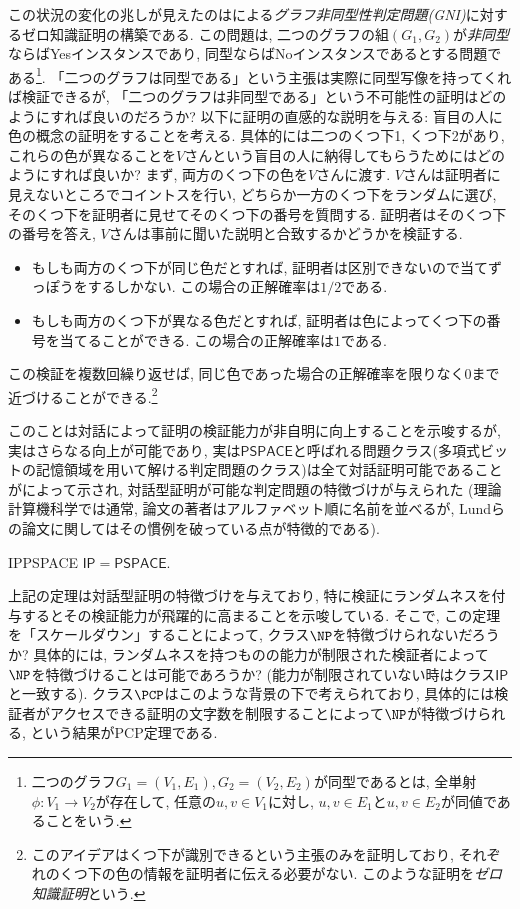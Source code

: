 この状況の変化の兆しが見えたのは\citet{GMW86}による\emph{グラフ非同型性判定問題(GNI)}に対するゼロ知識証明の構築である.
この問題は, 二つのグラフの組$(G_1,G_2)$が\emph{非同型}ならばYesインスタンスであり, 同型ならばNoインスタンスであるとする問題である\footnote{二つのグラフ$G_1=(V_1,E_1),G_2=(V_2,E_2)$が同型であるとは, 全単射$\phi\colon V_1\to V_2$が存在して, 任意の$u,v\in V_1$に対し, $u,v\in E_1$と$u,v\in E_2$が同値であることをいう.}.
「二つのグラフは同型である」という主張は実際に同型写像を持ってくれば検証できるが, 「二つのグラフは非同型である」という不可能性の証明はどのようにすれば良いのだろうか?
以下に証明の直感的な説明を与える:
盲目の人に色の概念の証明をすることを考える.
具体的には二つのくつ下1, くつ下2があり, これらの色が異なることを$V$さんという盲目の人に納得してもらうためにはどのようにすれば良いか?
まず, 両方のくつ下の色を$V$さんに渡す.
$V$さんは証明者に見えないところでコイントスを行い, どちらか一方のくつ下をランダムに選び, そのくつ下を証明者に見せてそのくつ下の番号を質問する.
証明者はそのくつ下の番号を答え, $V$さんは事前に聞いた説明と合致するかどうかを検証する.
\begin{itemize}
  \item もしも両方のくつ下が同じ色だとすれば, 証明者は区別できないので当てずっぽうをするしかない. この場合の正解確率は$1/2$である.
  \item もしも両方のくつ下が異なる色だとすれば, 証明者は色によってくつ下の番号を当てることができる. この場合の正解確率は$1$である.
\end{itemize}
この検証を複数回繰り返せば, 同じ色であった場合の正解確率を限りなく$0$まで近づけることができる.\footnote{このアイデアはくつ下が識別できるという主張のみを証明しており, それぞれのくつ下の色の情報を証明者に伝える必要がない. このような証明を\emph{ゼロ知識証明}という.} 

このことは対話によって証明の検証能力が非自明に向上することを示唆するが, 実はさらなる向上が可能であり, 実は$\mathsf{PSPACE}$と呼ばれる問題クラス(多項式ビットの記憶領域を用いて解ける判定問題のクラス)は全て対話証明可能であることが\citet{Shamir90,LFKN90}によって示され, 対話型証明が可能な判定問題の特徴づけが与えられた (理論計算機科学では通常, 論文の著者はアルファベット順に名前を並べるが, Lundらの論文に関してはその慣例を破っている点が特徴的である).

\begin{theorem}{}{IPPSPACE}
  $\mathsf{IP}=\mathsf{PSPACE}$.
\end{theorem}

上記の定理は対話型証明の特徴づけを与えており, 特に検証にランダムネスを付与するとその検証能力が飛躍的に高まることを示唆している.
そこで, この定理を「スケールダウン」することによって, クラス$\NP$を特徴づけられないだろうか?
具体的には, ランダムネスを持つものの能力が制限された検証者によって$\NP$を特徴づけることは可能であろうか? (能力が制限されていない時はクラス$\mathsf{IP}$と一致する).
クラス$\PCP$はこのような背景の下で考えられており, 具体的には検証者がアクセスできる証明の文字数を制限することによって$\NP$が特徴づけられる, という結果がPCP定理である.

